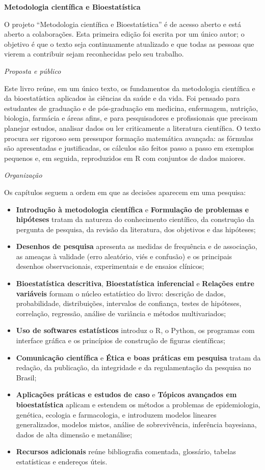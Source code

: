 \documentclass[
]{book}
\providecommand{\tightlist}{%
  \setlength{\itemsep}{0pt}\setlength{\parskip}{0pt}}
\begin{document}
\textbf{Metodologia científica e Bioestatística}

O projeto ``Metodologia científica e Bioestatística'' é de acesso aberto e está aberto a colaborações. Esta primeira edição foi escrita por um único autor; o objetivo é que o texto seja continuamente atualizado e que todas as pessoas que vierem a contribuir sejam reconhecidas pelo seu trabalho.

\emph{Proposta e público}

Este livro reúne, em um único texto, os fundamentos da metodologia científica e da bioestatística aplicados às ciências da saúde e da vida. Foi pensado para estudantes de graduação e de pós-graduação em medicina, enfermagem, nutrição, biologia, farmácia e áreas afins, e para pesquisadores e profissionais que precisam planejar estudos, analisar dados ou ler criticamente a literatura científica. O texto procura ser rigoroso sem pressupor formação matemática avançada: as fórmulas são apresentadas e justificadas, os cálculos são feitos passo a passo em exemplos pequenos e, em seguida, reproduzidos em R com conjuntos de dados maiores.

\emph{Organização}

Os capítulos seguem a ordem em que as decisões aparecem em uma pesquisa:

\begin{itemize}
\tightlist
\item
  \textbf{Introdução à metodologia científica} e \textbf{Formulação de problemas e hipóteses} tratam da natureza do conhecimento científico, da construção da pergunta de pesquisa, da revisão da literatura, dos objetivos e das hipóteses;
\item
  \textbf{Desenhos de pesquisa} apresenta as medidas de frequência e de associação, as ameaças à validade (erro aleatório, viés e confusão) e os principais desenhos observacionais, experimentais e de ensaios clínicos;
\item
  \textbf{Bioestatística descritiva}, \textbf{Bioestatística inferencial} e \textbf{Relações entre variáveis} formam o núcleo estatístico do livro: descrição de dados, probabilidade, distribuições, intervalos de confiança, testes de hipóteses, correlação, regressão, análise de variância e métodos multivariados;
\item
  \textbf{Uso de softwares estatísticos} introduz o R, o Python, os programas com interface gráfica e os princípios de construção de figuras científicas;
\item
  \textbf{Comunicação científica} e \textbf{Ética e boas práticas em pesquisa} tratam da redação, da publicação, da integridade e da regulamentação da pesquisa no Brasil;
\item
  \textbf{Aplicações práticas e estudos de caso} e \textbf{Tópicos avançados em bioestatística} aplicam e estendem os métodos a problemas de epidemiologia, genética, ecologia e farmacologia, e introduzem modelos lineares generalizados, modelos mistos, análise de sobrevivência, inferência bayesiana, dados de alta dimensão e metanálise;
\item
  \textbf{Recursos adicionais} reúne bibliografia comentada, glossário, tabelas estatísticas e endereços úteis.
\end{itemize}
\end{document}

